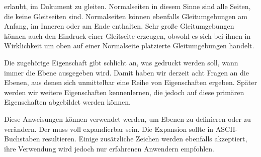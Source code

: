   erlaubt, im Dokument zu gleiten. Normalseiten in diesem Sinne sind alle
  Seiten, die keine Gleitseiten sind. Normalseiten können ebenfalls
  Gleitumgebungen am Anfang, im Inneren oder am Ende enthalten. Sehr große
  Gleitumgebungen können auch den Eindruck einer Gleitseite erzeugen, obwohl
  es sich bei ihnen in Wirklichkeit um oben auf einer Normalseite platzierte
  Gleitumgebungen handelt.
\item[Welchen Inhalt hat die Ebene?]
  \leavevmode{}\hskip 0pt
  Die zugehörige Eigenschaft gibt schlicht an, was gedruckt werden soll, wann
  immer die Ebene ausgegeben wird.
\iffree{\end{description}}{%
  \endgroup\par\bigskip\noindent\ignorespaces
}%
Damit haben wir derzeit acht Fragen an die Ebenen, aus denen sich unmittelbar
eine Reihe von Eigenschaften ergeben. Später
werden wir weitere Eigenschaften kennenlernen, die jedoch auf diese primären
Eigenschaften abgebildet werden können.

\begin{Declaration}
\end{Declaration}
Diese Anweisungen können verwendet werden, um Ebenen zu definieren oder zu
verändern. Der  muss voll expandierbar sein. Die
Expansion sollte in ASCII-Buchstaben resultieren. Einige zusätzliche Zeichen
werden ebenfalls akzeptiert, ihre Verwendung wird jedoch nur erfahrenen
Anwendern empfohlen.

